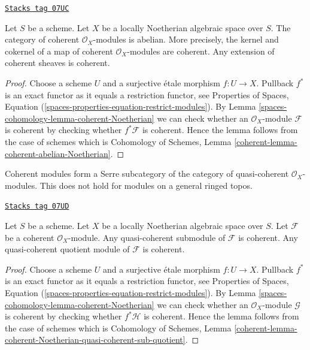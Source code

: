 \begin{lemma}
\label{spaces-cohomology-lemma-coherent-abelian-Noetherian}
\href{https://stacks.math.columbia.edu/tag/07UC}{\texttt{Stacks tag 07UC}}

Let $S$ be a scheme. Let $X$ be a locally Noetherian algebraic space over $S$.
The category of coherent $\mathcal{O}_X$-modules is abelian. More precisely,
the kernel and cokernel of a map of coherent $\mathcal{O}_X$-modules are
coherent. Any extension of coherent sheaves is coherent.
\end{lemma}

\begin{proof}
Choose a scheme $U$ and a surjective \'etale morphism $f : U \to X$.
Pullback $f^*$ is an exact functor as it equals a restriction functor, see
Properties of Spaces, Equation
(\ref{spaces-properties-equation-restrict-modules}).
By
Lemma \ref{spaces-cohomology-lemma-coherent-Noetherian} we can check whether an
$\mathcal{O}_X$-module $\mathcal{F}$ is
coherent by checking whether $f^*\mathcal{F}$ is coherent. Hence the
lemma follows from the case of schemes which is
Cohomology of Schemes, Lemma \ref{coherent-lemma-coherent-abelian-Noetherian}.
\end{proof}

Coherent modules form a Serre subcategory of the
category of quasi-coherent $\mathcal{O}_X$-modules. This does not hold
for modules on a general ringed topos.

\begin{lemma}
\label{spaces-cohomology-lemma-coherent-Noetherian-quasi-coherent-sub-quotient}
\href{https://stacks.math.columbia.edu/tag/07UD}{\texttt{Stacks tag 07UD}}

Let $S$ be a scheme.
Let $X$ be a locally Noetherian algebraic space over $S$.
Let $\mathcal{F}$ be a coherent $\mathcal{O}_X$-module.
Any quasi-coherent submodule of $\mathcal{F}$ is coherent.
Any quasi-coherent quotient module of $\mathcal{F}$ is coherent.
\end{lemma}

\begin{proof}
Choose a scheme $U$ and a surjective \'etale morphism $f : U \to X$.
Pullback $f^*$ is an exact functor as it equals a restriction functor, see
Properties of Spaces, Equation
(\ref{spaces-properties-equation-restrict-modules}).
By
Lemma \ref{spaces-cohomology-lemma-coherent-Noetherian} we can check whether an
$\mathcal{O}_X$-module $\mathcal{G}$ is
coherent by checking whether $f^*\mathcal{H}$ is coherent. Hence the
lemma follows from the case of schemes which is
Cohomology of Schemes, Lemma
\ref{coherent-lemma-coherent-Noetherian-quasi-coherent-sub-quotient}.
\end{proof}

